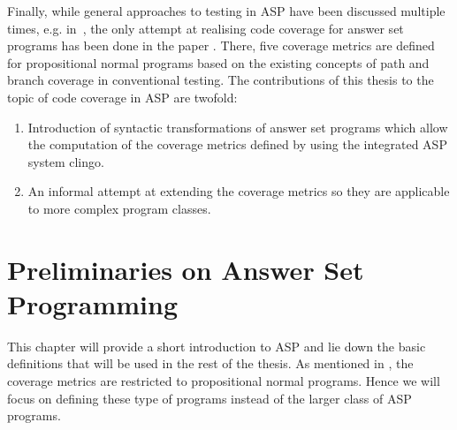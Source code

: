 Finally, while general approaches to testing in ASP have been discussed multiple times, e.g. in~\cite{GOT17, ABR21, Oet22}, the only attempt at realising code coverage for answer set programs has been done in the paper \cite{Jan+10}. 
There, five coverage metrics are defined for propositional normal programs based on the existing concepts of path and branch coverage in conventional testing. The contributions of this thesis to the topic of code coverage in ASP are twofold:
\begin{enumerate}
    \item Introduction of syntactic transformations of answer set programs which allow the computation of the coverage metrics defined by \citeauthor{Jan+10} using the integrated ASP system clingo.
    \item An informal attempt at extending the coverage metrics so they are applicable to more complex program classes.
\end{enumerate}

\begin{comment}
- Answer Set Programming is of growing importance in both academic and industry work (source?) and clingo is a popular solver for this

- Workflow Tools that make working with such programs easier and more comfortable barely exist. Research into these topics is only 
now getting more traction (source?)

- Testing is a very important part of a conventional software design approach.(source?)

- The topic of code coverage and it's use for conventional programming languages has been shown (source?)

- With this work I want to build on the previous work done on code coverage in answer set programming in this paper by~\textcite{Jan+10}

- To this end I developed a way to efficiently implement the coverage metrics defined in the paper.

- My implementation allows me to compute coverage using answer set programming. It also extends the given metrics to function with
almost all existing language construct instead of just for propositional programs.
\end{comment}


\chapter{Preliminaries on Answer Set Programming}
\label{ch:Preliminaries on answer set programming}
This chapter will provide a short introduction to ASP and lie down the basic definitions that will be used in the rest of the thesis. As mentioned in , the coverage metrics are restricted to propositional normal programs. Hence we will focus on defining these type of programs instead of the larger class of ASP programs.


